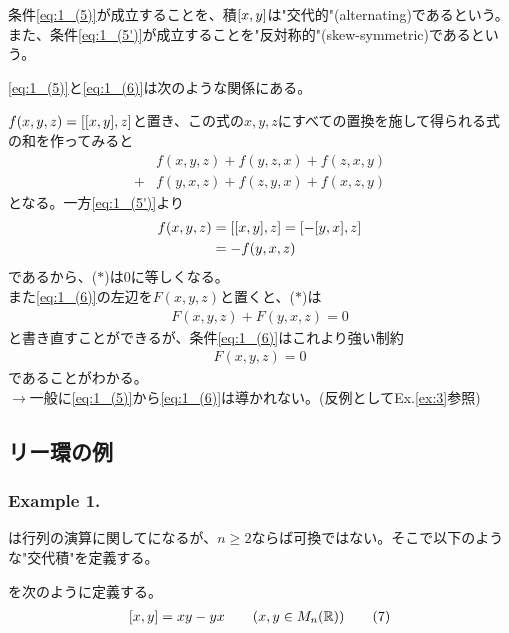 \documentclass[../main]{subfiles}
\begin{document}
\begin{named}
  条件\eqref{eq:1_(5)}が成立することを、積$\comm{x}{y}$は"交代的"(alternating)であるという。
  また、条件\eqref{eq:1_(5')}が成立することを"反対称的"(skew-symmetric)であるという。
\end{named}

\begin{remark}
  \eqref{eq:1_(5)}と\eqref{eq:1_(6)}は次のような関係にある。

  $f(x,y,z)=\comm{\comm{x}{y}}{z}$と置き、この式の$x,y,z$にすべての置換を施して得られる式の和を作ってみると
  \begin{align*}
    &f(x,y,z)+f(y,z,x)+f(z,x,y)\\
    +&f(y,x,z)+f(z,y,x)+f(x,z,y)\tag{$\ast$}
  \end{align*}
  となる。一方\eqref{eq:1_(5')}より
  \begin{align*}
    f(x,y,z)&=\comm{\comm{x}{y}}{z}=\comm{-\comm{y}{x}}{z}\\
    &=-f(y,x,z)
  \end{align*}
  であるから、($\ast$)は$0$に等しくなる。\\
  また\eqref{eq:1_(6)}の左辺を$F(x,y,z)$と置くと、($\ast$)は
  \begin{align*}
    F(x,y,z)+F(y,x,z) = 0
  \end{align*}
  と書き直すことができるが、条件\eqref{eq:1_(6)}はこれより強い制約
  \begin{align*}
    F(x,y,z)=0
  \end{align*}であることがわかる。\\
  $\longrightarrow$一般に\eqref{eq:1_(5)}から\eqref{eq:1_(6)}は導かれない。(反例としてEx.\ref{ex:3}参照)
\end{remark}


\subsection{リー環の例}
\subsubsection*{Example 1.}
は行列の演算に関してになるが、$n\ge2$ならば可換ではない。そこで以下のような"交代積"を定義する。

\begin{definition}[交代積]\label{Def:comm}
  を次のように定義する。
  \begin{align}
    \comm{x}{y}=xy-yx \qq{} (x,y\in M_n(\R)) \tag{7}\label{eq:1_(7)}
  \end{align}
\end{definition}
\end{document}
